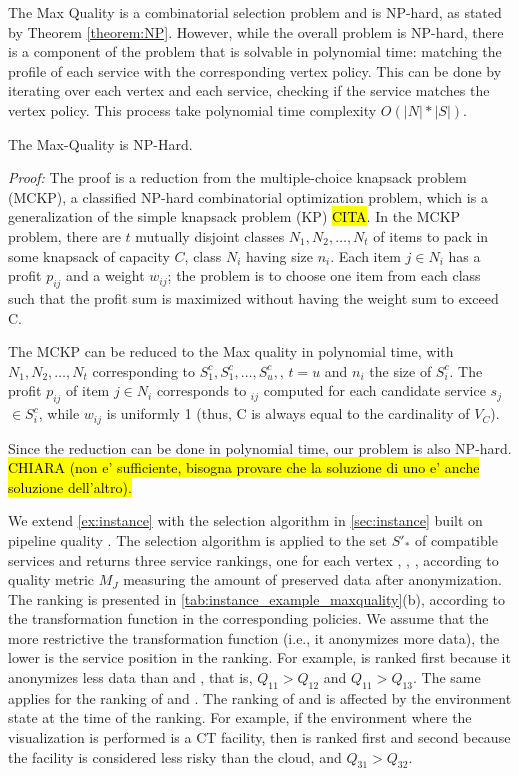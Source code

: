 The Max Quality \problem is a combinatorial selection problem and is NP-hard, as stated by Theorem \cref{theorem:NP}. However, while the overall problem is NP-hard, there is a component of the problem that is solvable in polynomial time: matching the profile of each service with the corresponding vertex policy. This can be done by iterating over each vertex and each service, checking if the service matches the vertex policy. This process take polynomial time complexity $O(|N|*|S|)$.

\begin{theorem}\label{theorem:NP}
  The Max-Quality \problem is NP-Hard.
\end{theorem}
\emph{Proof: }
The proof is a reduction from the multiple-choice knapsack problem (MCKP), a classified NP-hard combinatorial optimization problem, which is a generalization of the simple knapsack problem (KP) \cite{}\hl{CITA}. In the MCKP problem, there are $t$ mutually disjoint classes $N_1,N_2,\ldots,N_t$ of items to pack in some knapsack of capacity $C$, class $N_i$ having size $n_i$. Each item $j$$\in$$N_i$ has a profit $p_{ij}$ and a weight $w_{ij}$; the problem is to choose one item from each class such that the profit sum is maximized without having the weight sum to exceed C.

The MCKP can be reduced to the Max quality \problem in polynomial time, with $N_1,N_2,\ldots,N_t$ corresponding to $S^c_{1}, S^c_{1}, \ldots, S^c_{u},$, $t$$=$$u$ and $n_i$ the size of $S^c_{i}$. The profit $p_{ij}$ of item $j$$\in$$N_i$ corresponds to \textit{\q}$_{ij}$ computed for each candidate service $s_j$$\in$$S^c_{i}$, while $w_{ij}$ is uniformly 1 (thus, C is always equal to the cardinality of $V_C$).

Since the reduction can be done in polynomial time, our problem is also NP-hard. \hl{CHIARA (non e' sufficiente, bisogna provare che la soluzione di uno e' anche soluzione dell'altro).}


\begin{example}
  We extend \cref{ex:instance} with the selection algorithm in \cref{sec:instance} built on pipeline quality \q. The selection algorithm is applied to the set $S'_*$ of compatible services and returns three service rankings, one for each vertex , , , according to quality metric $M_J$ measuring the amount of preserved data after anonymization. The ranking is presented in \cref{tab:instance_example_maxquality}(b), according to the transformation function in the corresponding policies. 
  We assume that the more restrictive the transformation function (i.e., it anonymizes more data), the lower is the service position in the ranking.
  For example,  is ranked first because it anonymizes less data than  and , that is, $Q_{11}$$>$$Q_{12}$ and $Q_{11}$$>$$Q_{13}$.  The same applies for the ranking of  and .
  The ranking of  and  is affected by the environment state at the time of the ranking.   For example, if the environment where the visualization is performed is a CT facility, then  is ranked first and  second because the facility is considered less risky than the cloud, and $Q_{31}$$>$$Q_{32}$.
\end{example}

